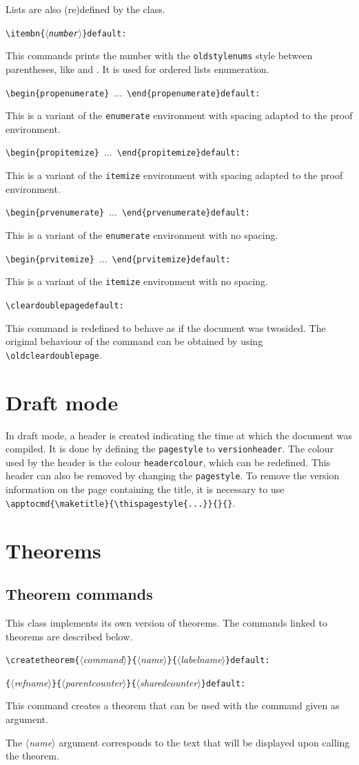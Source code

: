 \documentclass[12pt, babellanguage=british, titlespace, defaulttheorems]{altarticle}
\newcommand{\aargt}[1]{\ensuremath{\langle}\textrm{{\emph{#1}}}\ensuremath{\rangle}}
\newcommand{\argt}[1]{\texttt{\{}\ensuremath{\langle}\textrm{{\emph{#1}}}\ensuremath{\rangle}\texttt{\}}}
\newcommand{\commandline}[1][]{\def\argI{#1}\ccommandline}
\newcommand{\ccommandline}[2][]{\par\medskip\hspace*{-.75cm}\texttt{\textbackslash#2}\argI{}\hfill\if\relax\detokenize{#1}\relax\else\texttt{default:~#1}\fi\par}
\newcommand{\pcommandline}[1][]{\def\argI{#1}\pccommandline}
\newcommand{\pccommandline}[2][]{\par\hspace*{-.75cm}\hphantom{\texttt{\textbackslash#2}}\argI{}\hfill\if\relax\detokenize{#1}\relax\else\texttt{default:~#1}\fi\par}
\newcommand{\envline}[1][]{\def\argI{#1}\eenvline}
\newcommand{\eenvline}[2][]{\par\medskip\hspace*{-.75cm}\texttt{\textbackslash begin\{#2\}}\argI{}~...~\texttt{\textbackslash end\{#2\}}\hfill\if\relax\detokenize{#1}\relax\else\texttt{default:~#1}\fi\par}
\begin{document}
\null

Lists are also (re)defined by the class.
\commandline[]{itembn\argt{number}}This commands prints the number with the \texttt{oldstylenums} style between parentheses, like  and . It is used for ordered lists enumeration.
\envline{propenumerate}This is a variant of the \texttt{enumerate} environment with spacing adapted to the proof environment.
\envline{propitemize}This is a variant of the \texttt{itemize} environment with spacing adapted to the proof environment.
\envline{prvenumerate}This is a variant of the \texttt{enumerate} environment with no spacing.
\envline{prvitemize}This is a variant of the \texttt{itemize} environment with no spacing.

\null

\commandline{cleardoublepage}This command is redefined to behave as if the document was twosided. The original behaviour of the command can be obtained by using \texttt{\textbackslash oldcleardoublepage}.
\section{Draft mode}
In draft mode, a header is created indicating the time at which the document was compiled. It is done by defining the \texttt{pagestyle} to \texttt{versionheader}. The colour used by the header is the colour \texttt{headercolour}, which can be redefined. This header can also be removed by changing the \texttt{pagestyle}. To remove the version information on the page containing the title, it is necessary to use \texttt{\textbackslash apptocmd\{\textbackslash maketitle\}\{\textbackslash thispagestyle\{...\}\}\{\}\{\}}.
\section{Theorems}
\subsection{Theorem commands}
This class implements its own version of theorems. The commands linked to theorems are described below.
\commandline[\argt{command}\argt{name}\argt{labelname}]{createtheorem}
\pcommandline[\argt{refname}\argt{parentcounter}\argt{sharedcounter}]{createtheorem}This command creates a theorem that can be used with the command given as argument.

The \aargt{name} argument corresponds to the text that will be displayed upon calling the theorem.
\end{document}

